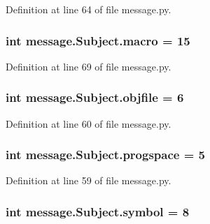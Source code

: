 Definition at line 64 of file message.\+py.

\hypertarget{classmessage_1_1Subject_abfddf4717207310a57097489b4c56ef7}{}
\subsubsection[{macro}]{\setlength{\rightskip}{0pt plus 5cm}int message.\+Subject.\+macro = 15\hspace{0.3cm}{\ttfamily [static]}}\label{classmessage_1_1Subject_abfddf4717207310a57097489b4c56ef7}


Definition at line 69 of file message.\+py.

\hypertarget{classmessage_1_1Subject_a113b165e9721b6bd3c2b60136e11e751}{}
\subsubsection[{objfile}]{\setlength{\rightskip}{0pt plus 5cm}int message.\+Subject.\+objfile = 6\hspace{0.3cm}{\ttfamily [static]}}\label{classmessage_1_1Subject_a113b165e9721b6bd3c2b60136e11e751}


Definition at line 60 of file message.\+py.

\hypertarget{classmessage_1_1Subject_afabf025ccc3a7f72fab7c696e4c79ea7}{}
\subsubsection[{progspace}]{\setlength{\rightskip}{0pt plus 5cm}int message.\+Subject.\+progspace = 5\hspace{0.3cm}{\ttfamily [static]}}\label{classmessage_1_1Subject_afabf025ccc3a7f72fab7c696e4c79ea7}


Definition at line 59 of file message.\+py.

\hypertarget{classmessage_1_1Subject_a4ce703784a4ff01e5a5c22bbcbc0cfbe}{}
\subsubsection[{symbol}]{\setlength{\rightskip}{0pt plus 5cm}int message.\+Subject.\+symbol = 8\hspace{0.3cm}{\ttfamily [static]}}\label{classmessage_1_1Subject_a4ce703784a4ff01e5a5c22bbcbc0cfbe}


